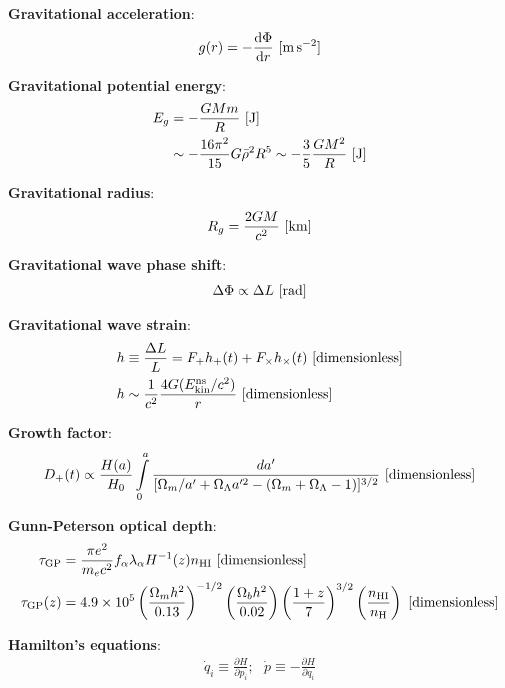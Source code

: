 \documentclass[a4paper,10pt]{article}
\begin{document}
{\noindent}\textbf{Gravitational acceleration}:
\begin{align*}
    g(r) = -\frac{{\rm d}\Phi}{{\rm d}r} ~ [{\rm m\,s^{-2}}]
\end{align*}

{\noindent}\textbf{Gravitational potential energy}:
\begin{align*}
    E_g &= -\frac{GMm}{R} ~ [{\rm J}] \\
    &\sim -\frac{16\pi^2}{15}G\bar{\rho}^2R^5 \sim -\frac{3}{5}\frac{GM^2}{R} ~ [{\rm J}]
\end{align*}

{\noindent}\textbf{Gravitational radius}:
\begin{align*}
    R_g = \frac{2GM}{c^2} ~ [{\rm km}]
\end{align*}

{\noindent}\textbf{Gravitational wave phase shift}:
\begin{align*}
    \Delta\Phi \propto \Delta L ~ [{\rm rad}]
\end{align*}

{\noindent}\textbf{Gravitational wave strain}:
\begin{align*}
    h &\equiv \frac{\Delta L}{L} = F_+h_+(t) + F_\times h_\times(t) ~ [{\rm dimensionless}] \\
    h &\sim \frac{1}{c^2} \frac{4G(E_{\rm kin}^{\rm ns}/c^2)}{r}  ~ [{\rm dimensionless}]
\end{align*}

{\noindent}\textbf{Growth factor}:
\begin{align*}
    D_+(t) \propto \frac{H(a)}{H_0}\int\limits_0^a \frac{da'}{[\Omega_m/a'+\Omega_\Lambda a'^2-(\Omega_m+\Omega_\Lambda-1)]^{3/2}} ~ [{\rm dimensionless}]
\end{align*}

{\noindent}\textbf{Gunn-Peterson optical depth}:
\begin{align*}
    \tau_\mathrm{GP} &= \frac{\pi e^2}{m_ec^2}f_\alpha\lambda_\alpha H^{-1}(z)n_\mathrm{HI} ~ [{\rm dimensionless}] \\
    \tau_\mathrm{GP}(z) &= 4.9\times10^5 \left(\frac{\Omega_mh^2}{0.13}\right)^{-1/2} \left(\frac{\Omega_bh^2}{0.02}\right) \left(\frac{1+z}{7}\right)^{3/2} \left(\frac{n_\mathrm{HI}}{n_\mathrm{H}}\right) ~ [{\rm dimensionless}]
\end{align*}

{\noindent}\textbf{Hamilton's equations}:
\begin{align*}
    \dot{q}_i \equiv \frac{\partial H}{\partial p_i}; ~~~ \dot{p} \equiv -\frac{\partial H}{\partial q_i}
\end{align*}
\end{document}
